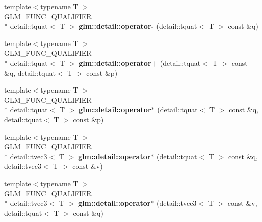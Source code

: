 \begin{DoxyCompactItemize}
\item 
\hypertarget{namespaceglm_1_1detail_a545892ee159f68c5d77e3b6290a745c2}{{\footnotesize template$<$typename T $>$ }\\G\-L\-M\-\_\-\-F\-U\-N\-C\-\_\-\-Q\-U\-A\-L\-I\-F\-I\-E\-R \\*
detail\-::tquat$<$ T $>$ {\bfseries glm\-::detail\-::operator-\/} (detail\-::tquat$<$ T $>$ const \&q)}\label{namespaceglm_1_1detail_a545892ee159f68c5d77e3b6290a745c2}

\item 
\hypertarget{namespaceglm_1_1detail_a807262190862c9cb8b7c08f547371831}{{\footnotesize template$<$typename T $>$ }\\G\-L\-M\-\_\-\-F\-U\-N\-C\-\_\-\-Q\-U\-A\-L\-I\-F\-I\-E\-R \\*
detail\-::tquat$<$ T $>$ {\bfseries glm\-::detail\-::operator+} (detail\-::tquat$<$ T $>$ const \&q, detail\-::tquat$<$ T $>$ const \&p)}\label{namespaceglm_1_1detail_a807262190862c9cb8b7c08f547371831}

\item 
\hypertarget{namespaceglm_1_1detail_a74d820bafaf78ba2185f70dccc368036}{{\footnotesize template$<$typename T $>$ }\\G\-L\-M\-\_\-\-F\-U\-N\-C\-\_\-\-Q\-U\-A\-L\-I\-F\-I\-E\-R \\*
detail\-::tquat$<$ T $>$ {\bfseries glm\-::detail\-::operator$\ast$} (detail\-::tquat$<$ T $>$ const \&q, detail\-::tquat$<$ T $>$ const \&p)}\label{namespaceglm_1_1detail_a74d820bafaf78ba2185f70dccc368036}

\item 
\hypertarget{namespaceglm_1_1detail_a4c95a8e1aece02bfd9cca3f937c95258}{{\footnotesize template$<$typename T $>$ }\\G\-L\-M\-\_\-\-F\-U\-N\-C\-\_\-\-Q\-U\-A\-L\-I\-F\-I\-E\-R \\*
detail\-::tvec3$<$ T $>$ {\bfseries glm\-::detail\-::operator$\ast$} (detail\-::tquat$<$ T $>$ const \&q, detail\-::tvec3$<$ T $>$ const \&v)}\label{namespaceglm_1_1detail_a4c95a8e1aece02bfd9cca3f937c95258}

\item 
\hypertarget{namespaceglm_1_1detail_ac8613d44bc2e39003a9f9b698ee66132}{{\footnotesize template$<$typename T $>$ }\\G\-L\-M\-\_\-\-F\-U\-N\-C\-\_\-\-Q\-U\-A\-L\-I\-F\-I\-E\-R \\*
detail\-::tvec3$<$ T $>$ {\bfseries glm\-::detail\-::operator$\ast$} (detail\-::tvec3$<$ T $>$ const \&v, detail\-::tquat$<$ T $>$ const \&q)}\label{namespaceglm_1_1detail_ac8613d44bc2e39003a9f9b698ee66132}


\end{DoxyCompactItemize}
